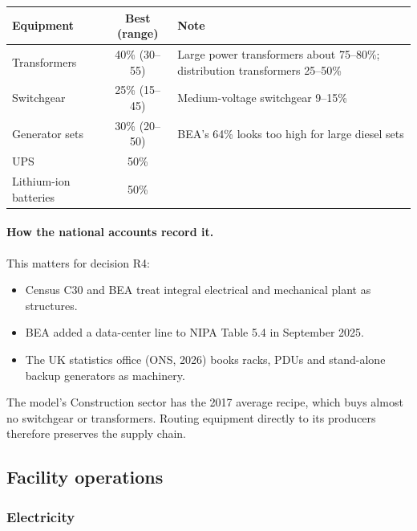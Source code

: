 \begin{center}\small
\begin{tabular}{lcp{8cm}}
\toprule
Equipment & Best (range) & Note \\
\midrule
Transformers & 40\% (30--55) & Large power transformers about 75--80\%; distribution transformers 25--50\% \\
Switchgear & 25\% (15--45) & Medium-voltage switchgear 9--15\% \\
Generator sets & 30\% (20--50) & BEA's 64\% looks too high for large diesel sets \\
UPS & 50\% & \\
Lithium-ion batteries & 50\% & \\
\bottomrule
\end{tabular}
\end{center}

\paragraph{How the national accounts record it.} This matters for decision R4:
\begin{itemize}
  \item Census C30 and BEA treat integral electrical and mechanical plant as structures.
  \item BEA added a data-center line to NIPA Table 5.4 in September 2025.
  \item The UK statistics office (ONS, 2026) books racks, PDUs and stand-alone backup generators
    as machinery.
\end{itemize}
The model's Construction sector has the 2017 average recipe, which buys almost no switchgear or
transformers. Routing equipment directly to its producers therefore preserves the supply chain.

\subsection{Facility operations}

\subsubsection{Electricity}

\begin{table}[ht]\centering\small
\caption{Electricity per MW of IT load per year}\label{tab:elec}
\end{table}

